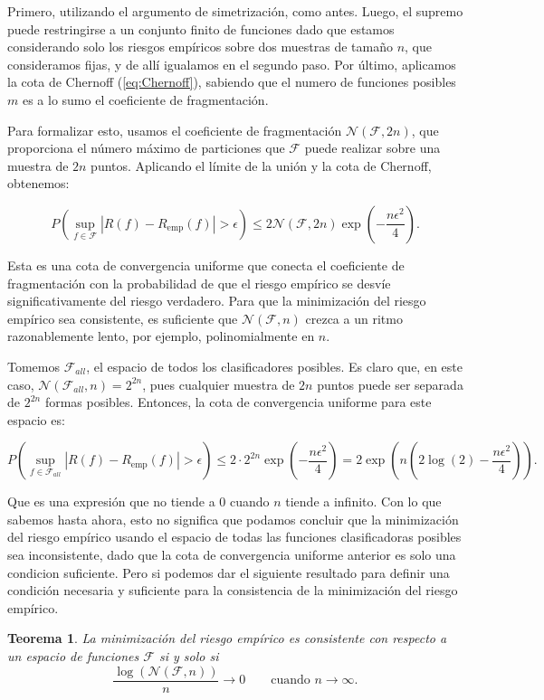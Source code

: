\documentclass{report}
\newtheorem{thm}{Teorema}[section]
\begin{document}
Primero, utilizando el argumento de simetrización, como antes. Luego, el supremo puede restringirse a un conjunto finito de funciones
dado que estamos considerando solo los riesgos empíricos sobre dos muestras de tamaño $n$, que consideramos fijas, y de allí igualamos
en el segundo paso. Por último, aplicamos la cota de Chernoff (\ref{eq:Chernoff}), sabiendo que el numero de funciones
posibles $m$ es a lo sumo el coeficiente de fragmentación.\newline

Para formalizar esto, usamos el coeficiente de fragmentación \(\mathcal{N}(\mathcal{F}, 2n)\), que proporciona el número máximo 
de particiones que \(\mathcal{F}\) puede realizar sobre una muestra de \(2n\) puntos. Aplicando el límite de la unión 
y la cota de Chernoff, obtenemos:

\begin{equation} 
    P\left(\sup_{f \in \mathcal{F}} |R(f) - R_{\text{emp}}(f)| > \epsilon \right) \leq 
    2\mathcal{N}(\mathcal{F}, 2n) \exp\left(-\frac{n\epsilon^2}{4}\right). \label{eq: cota convergencia coeficiente fragmentacion}
\end{equation}

Esta es una cota de convergencia uniforme que conecta el coeficiente de fragmentación con la probabilidad de 
que el riesgo empírico se desvíe significativamente del riesgo verdadero. Para que la minimización del riesgo 
empírico sea consistente, es suficiente que $\mathcal{N}(\mathcal{F}, n)$ crezca a un ritmo razonablemente lento, por ejemplo, 
polinomialmente en \(n\).\newline

Tomemos $\mathcal{F}_{all}$, el espacio de todos los clasificadores posibles. Es claro que, en este caso, $\mathcal{N}(\mathcal{F}_{all}, n)=2^{2n}$,
pues cualquier muestra de $2n$ puntos puede ser separada de $2^{2n}$ formas posibles. Entonces, la cota de convergencia uniforme para este espacio
es:

\[
P\left(\sup_{f \in \mathcal{F}_{all}} |R(f) - R_{\text{emp}}(f)| > \epsilon \right) \leq
2\cdot 2^{2n} \exp\left(-\frac{n\epsilon^2}{4}\right) = 2\exp\left(n\left( 2\log(2) - \frac{n\epsilon^2}{4}\right)\right).
\]

Que es una expresión que no tiende a $0$ cuando $n$ tiende a infinito. Con lo que sabemos hasta ahora, esto no significa que podamos 
concluir que la minimización del riesgo empírico
usando el espacio de todas las funciones clasificadoras posibles sea inconsistente, dado que la cota de convergencia uniforme anterior
es solo una condicion suficiente. Pero si podemos dar el siguiente resultado para definir una condición necesaria y suficiente para
la consistencia de la minimización del riesgo empírico.
\begin{thm}\label{thm: consistencia ssi}
    La minimización del riesgo empírico es consistente con respecto a un espacio de funciones $\mathcal{F}$ si y solo si
    \[
    \frac{\log\left(\mathcal{N}(\mathcal{F}, n)\right)}{n} \rightarrow 0 \qquad \text{cuando } n \to \infty.
    \]
    
\end{thm}
\end{document}
